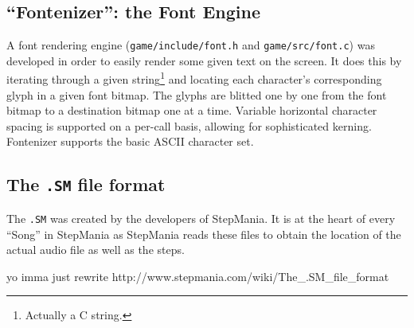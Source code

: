 \subsection{``Fontenizer'': the Font Engine}
	A font rendering engine (\texttt{game/include/font.h} and \texttt{game/src/font.c}) was developed in order to easily render some given text on the screen.
	It does this by iterating through a given string\footnote{Actually a C string.} and locating each character's corresponding glyph in a given font bitmap.
	The glyphs are blitted one by one from the font bitmap to a destination bitmap one at a time.
    Variable horizontal character spacing is supported on a per-call basis, allowing for sophisticated kerning.
    Fontenizer supports the basic ASCII character set.
        
\subsection{The \texttt{.SM} file format}
	The \texttt{.SM} was created by the developers of StepMania. It is at the heart of every ``Song'' in StepMania as StepMania reads these files to obtain the location of the actual audio file as well as the steps.
	
	yo imma just rewrite http://www.stepmania.com/wiki/The_.SM_file_format
